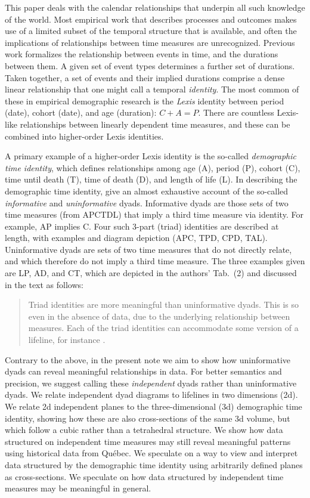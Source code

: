 \documentclass{bmcart}
\begin{document}
This paper deals with the calendar relationships that underpin all such knowledge of the world. Most empirical work that describes processes and outcomes makes use of a limited subset of the temporal structure that is available, and often the implications of relationships between time measures are unrecognized. Previous work \citep{riffe2017demographictime} formalizes the relationship between events in time, and the durations between them. A given set of event types determines a further set of durations. Taken together, a set of events and their implied durations comprise a dense linear relationship that one might call a temporal \emph{identity}. The most common of these in empirical demographic research is the \emph{Lexis} identity between period (date), cohort (date), and age (duration): $C + A = P$. There are countless Lexis-like relationships between linearly dependent time measures, and these can be combined into higher-order Lexis identities. 

A primary example of a higher-order Lexis identity is the so-called \emph{demographic time identity}, which defines relationships among age (A), period (P), cohort (C), time until death (T), time of death (D), and length of life (L). In describing the demographic time identity, \citet{riffe2017demographictime} give an almost exhaustive account of the so-called \emph{informative} and \emph{uninformative} dyads. Informative dyads are those sets of two time measures (from APCTDL) that imply a third time measure via identity. For example, AP implies C. Four such 3-part (triad) identities are described at length, with examples and diagram depiction (APC, TPD, CPD, TAL). Uninformative dyads are sets of two time measures that do not directly relate, and which therefore do not imply a third time measure. The three examples given are LP, AD, and CT, which are depicted in the authors' Tab.~(2) and discussed in the text as follows:
\begin{quote}
Triad identities are more meaningful than uninformative dyads. This is so even in the absence of data, due to the underlying relationship between measures. Each of the triad identities can accommodate some version of a lifeline, for instance \citep[p5][]{riffe2017demographictime}. 
\end{quote}

Contrary to the above, in the present note we aim to show how uninformative dyads can reveal meaningful relationships in data. For better semantics and precision, we suggest calling these \emph{independent} dyads rather than uninformative dyads. We relate independent dyad diagrams to lifelines in two dimensions (2d). We relate 2d independent planes to the three-dimensional (3d) demographic time identity, showing how these are also cross-sections of the same 3d volume, but which follow a cubic rather than a tetrahedral structure. We show how data structured on independent time measures may still reveal meaningful patterns using historical data from Qu\'{e}bec. We speculate on a way to view and interpret data structured by the demographic time identity using arbitrarily defined planes as cross-sections. We speculate on how data structured by independent time measures may be meaningful in general.
\end{document}
